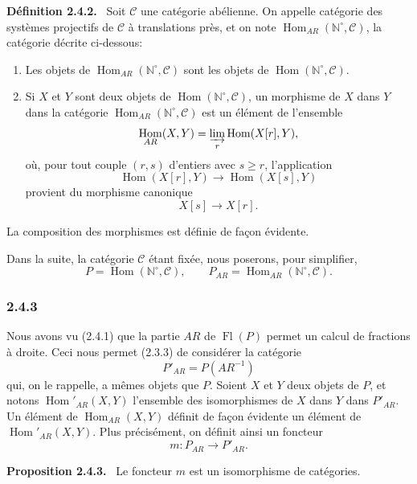 \documentclass[11pt]{article}
\providecommand{\NN}{\mathbb{N}}
\newenvironment{statement}[1]{\par\medskip\noindent\textbf{#1.}\ }{\par\medskip}
\DeclareMathOperator{\Hom}{Hom}
\providecommand{\Hom}{\operatorname{Hom}}
\providecommand{\Fl}{\operatorname{Fl}}
\providecommand{\NN}{\mathbb N}
\providecommand{\cC}{\mathcal C}
\providecommand{\cC}{\mathcal C}
\begin{document}
\begin{statement}{Définition 2.4.2}
Soit $\cC$ une catégorie abélienne. On appelle catégorie des systèmes projectifs de $\cC$ à translations près, et on note $\Hom_{AR}(\NN^\circ,\cC)$, la catégorie décrite ci-dessous:
\begin{enumerate}[label=(\roman*)]
\item Les objets de $\Hom_{AR}(\NN^\circ,\cC)$ sont les objets de $\Hom(\NN^\circ,\cC)$.
\item Si $X$ et $Y$ sont deux objets de $\Hom(\NN^\circ,\cC)$, un morphisme de $X$ dans $Y$ dans la catégorie $\Hom_{AR}(\NN^\circ,\cC)$ est un élément de l'ensemble
\[
\Hom_{AR}(X,Y)=\varinjlim_r\Hom(X[r],Y),
\]
où, pour tout couple $(r,s)$ d'entiers avec $s\ge r$, l'application
\[
\Hom(X[r],Y)\longrightarrow\Hom(X[s],Y)
\]
provient du morphisme canonique
\[
X[s]\longrightarrow X[r].
\]
\end{enumerate}
La composition des morphismes est définie de façon évidente.
\end{statement}
Dans la suite, la catégorie $\cC$ étant fixée, nous poserons, pour simplifier,
\[
P=\Hom(\NN^\circ,\cC),\qquad P_{AR}=\Hom_{AR}(\NN^\circ,\cC).
\]

\subsubsection*{2.4.3}
Nous avons vu (2.4.1) que la partie $AR$ de $\Fl(P)$ permet un calcul de fractions à droite. Ceci nous permet (2.3.3) de considérer la catégorie
\[
P'_{AR}=P(AR^{-1})
\]
qui, on le rappelle, a mêmes objets que $P$. Soient $X$ et $Y$ deux objets de $P$, et notons $\Hom'_{AR}(X,Y)$ l'ensemble des isomorphismes de $X$ dans $Y$ dans $P'_{AR}$. Un élément de $\Hom_{AR}(X,Y)$ définit de façon évidente un élément de $\Hom'_{AR}(X,Y)$. Plus précisément, on définit ainsi un foncteur
\[
m:P_{AR}\longrightarrow P'_{AR}.
\]

\begin{statement}{Proposition 2.4.3}
Le foncteur $m$ est un isomorphisme de catégories.
\end{statement}
\end{document}
